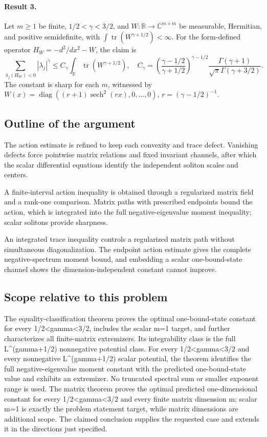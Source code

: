 \documentclass[11pt]{article}
\begin{document}
\paragraph{Result 3.} Let \(m\ge1\) be finite, \(1/2<\gamma<3/2\), and \(W:\mathbb R\to\mathbb C^{m\times m}\) be measurable, Hermitian, and positive semidefinite, with \(\int\operatorname{tr}(W^{\gamma+1/2})<\infty\). For the form-defined operator \(H_W=-d^2/dx^2-W\), the claim is
\[
 \sum_{\lambda_j(H_W)<0}|\lambda_j|^\gamma\le C_\gamma\int_{\mathbb R}\operatorname{tr}(W^{\gamma+1/2}),\quad
 C_\gamma=\left(\frac{\gamma-1/2}{\gamma+1/2}\right)^{\gamma-1/2}
 \frac{\Gamma(\gamma+1)}{\sqrt\pi\Gamma(\gamma+3/2)}.
\]
The constant is sharp for each \(m\), witnessed by \(W(x)=\operatorname{diag}((r+1)\operatorname{sech}^2(rx),0,\ldots,0)\), \(r=(\gamma-1/2)^{-1}\).

\subsection{Outline of the argument}
The action estimate is refined to keep each convexity and trace defect. Vanishing defects force pointwise matrix relations and fixed invariant channels, after which the scalar differential equations identify the independent soliton scales and centers.

A finite-interval action inequality is obtained through a regularized matrix field and a rank-one comparison. Matrix paths with prescribed endpoints bound the action, which is integrated into the full negative-eigenvalue moment inequality; scalar solitons provide sharpness.

An integrated trace inequality controls a regularized matrix path without simultaneous diagonalization. The endpoint action estimate gives the complete negative-spectrum moment bound, and embedding a scalar one-bound-state channel shows the dimension-independent constant cannot improve.

\subsection{Scope relative to this problem}
The equality-classification theorem proves the optimal one-bound-state constant for every 1/2<gamma<3/2, includes the scalar m=1 target, and further characterizes all finite-matrix extremizers. Its integrability class is the full L\textasciicircum{}(gamma+1/2) nonnegative potential class. For every 1/2<gamma<3/2 and every nonnegative L\textasciicircum{}(gamma+1/2) scalar potential, the theorem identifies the full negative-eigenvalue moment constant with the predicted one-bound-state value and exhibits an extremizer. No truncated spectral sum or smaller exponent range is used. The matrix theorem proves the optimal predicted one-dimensional constant for every 1/2<gamma<3/2 and every finite matrix dimension m; scalar m=1 is exactly the problem statement target, while matrix dimensions are additional scope. The claimed conclusion supplies the requested case and extends it in the directions just specified.
\end{document}
